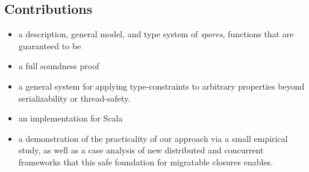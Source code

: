 \documentclass{llncs}
\begin{document}










\subsection{Contributions}

\begin{itemize}
\item a description, general model, and type system of \textit{spores}, functions that are guaranteed to be 
\item a full soundness proof
\item a general system for applying type-constraints to arbitrary properties beyond serializability or thread-safety.
\item an implementation for Scala
\item a demonstration of the practicality of our approach via a small
empirical study, as well as a case analysis of new distributed and concurrent
frameworks that this safe  foundation for migratable closures enables.

\end{itemize}
\end{document}
